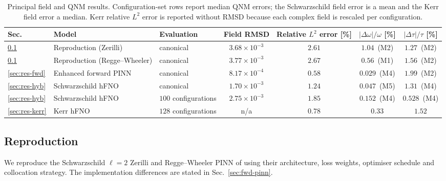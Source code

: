 \begin{table}[!ht]
\centering
\caption{Principal field and QNM results. Configuration-set rows
report median QNM errors; the Schwarzschild field error is a mean and
the Kerr field error a median. Kerr relative $L^2$ error is reported
without RMSD because each complex field is rescaled per configuration.}
\label{tab:results-summary}
\footnotesize
\setlength{\tabcolsep}{1pt}
\renewcommand{\arraystretch}{1.15}
\begin{tabular}{@{}lllcccc@{}}
\toprule
Sec. & Model & Evaluation & Field RMSD & \shortstack{Relative\\$L^2$ error [\%]}
     & $|\Delta\omega|/\omega$ [\%] & $|\Delta\tau|/\tau$ [\%] \\
\midrule
\ref{sec:res-repro} & Reproduction (Zerilli)        & canonical           & $3.68\times 10^{-3}$ & $2.61$  & $1.04$~(M2)  & $1.27$~(M2)  \\
\ref{sec:res-repro} & Reproduction (Regge--Wheeler) & canonical           & $3.77\times 10^{-3}$ & $2.67$  & $0.56$~(M1)  & $1.56$~(M2)  \\
\ref{sec:res-fwd}   & Enhanced forward PINN         & canonical           & $8.17\times 10^{-4}$ & $0.58$  & $0.029$~(M4) & $1.99$~(M2)  \\
\ref{sec:res-hyb}   & Schwarzschild hFNO            & canonical           & $1.70\times 10^{-3}$ & $1.24$  & $0.047$~(M5) & $1.31$~(M4)  \\
\ref{sec:res-hyb}   & Schwarzschild hFNO            & $100$ configurations & $2.75\times 10^{-3}$ & $1.85$  & $0.152$~(M4) & $0.528$~(M4) \\
\ref{sec:res-kerr}  & Kerr hFNO                     & $128$ configurations & n/a                  & $0.78$  & $0.33$ & $1.52$ \\
\bottomrule
\end{tabular}
\end{table}

\subsection{Reproduction}
\label{sec:res-repro}

We reproduce the Schwarzschild $\ell=2$ Zerilli and Regge--Wheeler
PINN of \citet{Patel2024pinn} using their architecture, loss weights,
optimiser schedule and collocation strategy. The implementation
differences are stated in Sec.~\ref{sec:fwd-pinn}.

